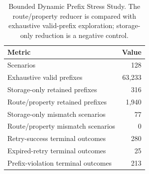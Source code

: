 \begin{table}[t]
\centering\scriptsize
\caption{Bounded Dynamic Prefix Stress Study. The route/property reducer is compared with exhaustive valid-prefix exploration; storage-only reduction is a negative control.}
\label{tab:dynamic-stress}
\begin{tabular}{@{}lr@{}}\toprule
Metric & Value \\ \midrule
Scenarios & 128 \\
Exhaustive valid prefixes & 63,233 \\
Storage-only retained prefixes & 316 \\
Route/property retained prefixes & 1,940 \\
Storage-only mismatch scenarios & 77 \\
Route/property mismatch scenarios & 0 \\
Retry-success terminal outcomes & 280 \\
Expired-retry terminal outcomes & 25 \\
Prefix-violation terminal outcomes & 213 \\
\bottomrule\end{tabular}
\end{table}

